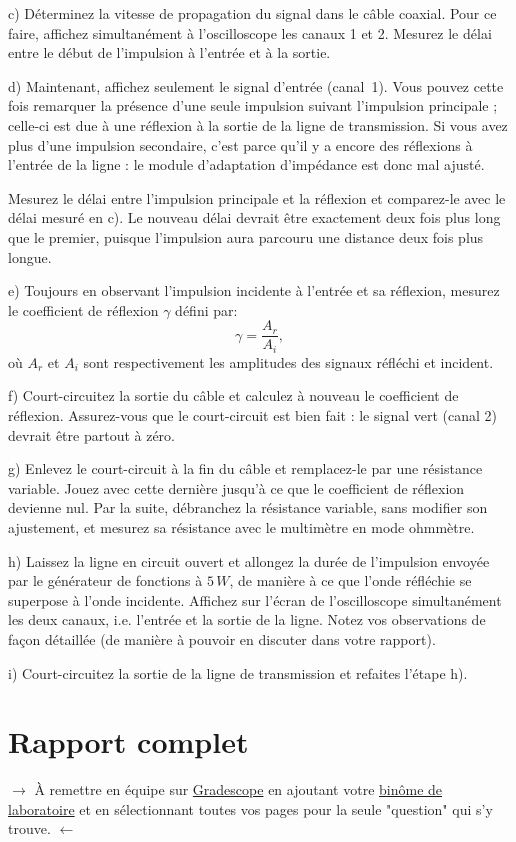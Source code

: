 \documentclass[canadien,12pt,oneside,letterpaper]{article}
\begin{document}
c) Déterminez la vitesse de propagation du signal dans le câble coaxial. Pour ce faire, affichez simultanément à l'oscilloscope les canaux 1 et 2. Mesurez le délai entre le début de l'impulsion à l'entrée et à la sortie.

d) Maintenant, affichez seulement le signal d'entrée (canal~1). Vous pouvez cette fois remarquer la présence d'une seule impulsion suivant l'impulsion principale ; celle-ci est due à une réflexion à la sortie de la ligne de transmission. Si vous avez plus d'une impulsion secondaire, c'est parce qu'il y a encore des réflexions à l'entrée de la ligne : le module d'adaptation d'impédance est donc mal ajusté.

Mesurez le délai entre l'impulsion principale et la réflexion et comparez-le avec le délai mesuré en c). Le nouveau délai devrait être exactement deux fois plus long que le premier, puisque l'impulsion aura parcouru une distance deux fois plus longue.

e) Toujours en observant l'impulsion incidente à l'entrée et sa réflexion, mesurez le coefficient de réflexion $\gamma$ défini par:
\begin{equation*}
    \gamma=\frac{A_r}{A_i},
\end{equation*}
où $A_r$ et $A_i$ sont respectivement les amplitudes des signaux réfléchi et incident.

f) Court-circuitez la sortie du câble et calculez à nouveau le coefficient de réflexion. Assurez-vous que le court-circuit est bien fait : le signal vert (canal 2) devrait être partout à zéro.

g) Enlevez le court-circuit à la fin du câble et remplacez-le par une résistance variable. Jouez avec cette dernière jusqu'à ce que le coefficient de réflexion devienne nul. Par la suite, débranchez la résistance variable, sans modifier son ajustement, et mesurez sa résistance avec le multimètre en mode ohmmètre.

h) Laissez la ligne en circuit ouvert et allongez la durée de l'impulsion envoyée par le générateur de fonctions à $5\,W$, de manière à ce que l'onde réfléchie se superpose à l'onde incidente. Affichez sur l'écran de l'oscilloscope simultanément les deux canaux, i.e. l'entrée et la sortie de la ligne. Notez vos observations de façon détaillée (de manière à pouvoir en discuter dans votre rapport).

i) Court-circuitez la sortie de la ligne de transmission et refaites l'étape h).


\section{Rapport complet} \label{sec:grade}
\vspace{-0.5cm}
\begin{center}
 $\rightarrow$ À remettre en équipe sur \href{https://www.gradescope.com/}{Gradescope} en ajoutant votre \href{https://help.gradescope.com/article/m5qz2xsnjy-student-add-group-members}{binôme de laboratoire} et en sélectionnant toutes vos pages pour la seule "question" qui s'y trouve. $\leftarrow$
\end{center}
\end{document}
